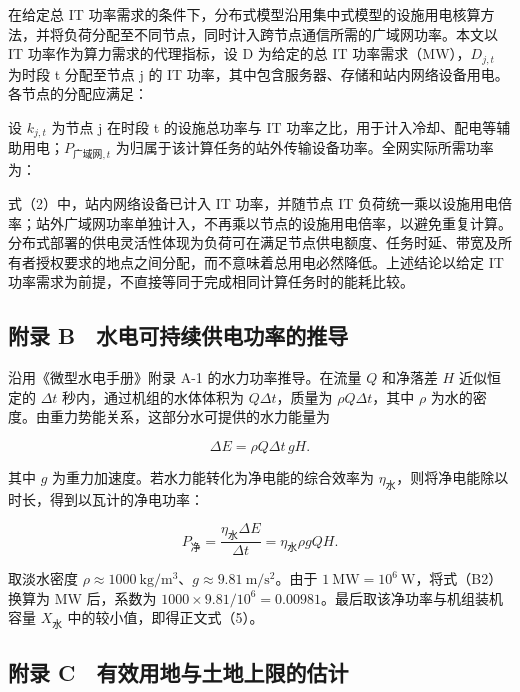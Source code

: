 在给定总 IT 功率需求的条件下，分布式模型沿用集中式模型的设施用电核算方法，并将负荷分配至不同节点，同时计入跨节点通信所需的广域网功率。本文以 IT 功率作为算力需求的代理指标，设 D 为给定的总 IT 功率需求（MW），$D_{j,t}$ 为时段 t 分配至节点 j 的 IT 功率，其中包含服务器、存储和站内网络设备用电。各节点的分配应满足：

设 $k_{j,t}$ 为节点 j 在时段 t 的设施总功率与 IT 功率之比，用于计入冷却、配电等辅助用电；$P_{\text{广域网},t}$ 为归属于该计算任务的站外传输设备功率。全网实际所需功率为：

式（2）中，站内网络设备已计入 IT 功率，并随节点 IT 负荷统一乘以设施用电倍率；站外广域网功率单独计入，不再乘以节点的设施用电倍率，以避免重复计算。分布式部署的供电灵活性体现为负荷可在满足节点供电额度、任务时延、带宽及所有者授权要求的地点之间分配，而不意味着总用电必然降低。上述结论以给定 IT 功率需求为前提，不直接等同于完成相同计算任务时的能耗比较。

\subsection{附录 B　水电可持续供电功率的推导}

沿用《微型水电手册》附录 A-1 的水力功率推导\cite{q1ref06}。在流量 $Q$ 和净落差 $H$ 近似恒定的 $\Delta t$ 秒内，通过机组的水体体积为 $Q\Delta t$，质量为 $\rho Q\Delta t$，其中 $\rho$ 为水的密度。由重力势能关系，这部分水可提供的水力能量为

\begin{equation}
\Delta E=\rho Q\Delta t\,gH.
\tag{B1}
\end{equation}

其中 $g$ 为重力加速度。若水力能转化为净电能的综合效率为 $\eta_{\text{水}}$，则将净电能除以时长，得到以瓦计的净电功率：

\begin{equation}
P_{\text{净}}=\frac{\eta_{\text{水}}\Delta E}{\Delta t}
=\eta_{\text{水}}\rho gQH.
\tag{B2}
\end{equation}

取淡水密度 $\rho\approx1000\ \mathrm{kg/m^3}$、$g\approx9.81\ \mathrm{m/s^2}$。由于 $1\ \mathrm{MW}=10^6\ \mathrm W$，将式（B2）换算为 MW 后，系数为 $1000\times9.81/10^6=0.00981$。最后取该净功率与机组装机容量 $X_{\text{水}}$ 中的较小值，即得正文式（5）。

\subsection{附录 C　有效用地与土地上限的估计}

